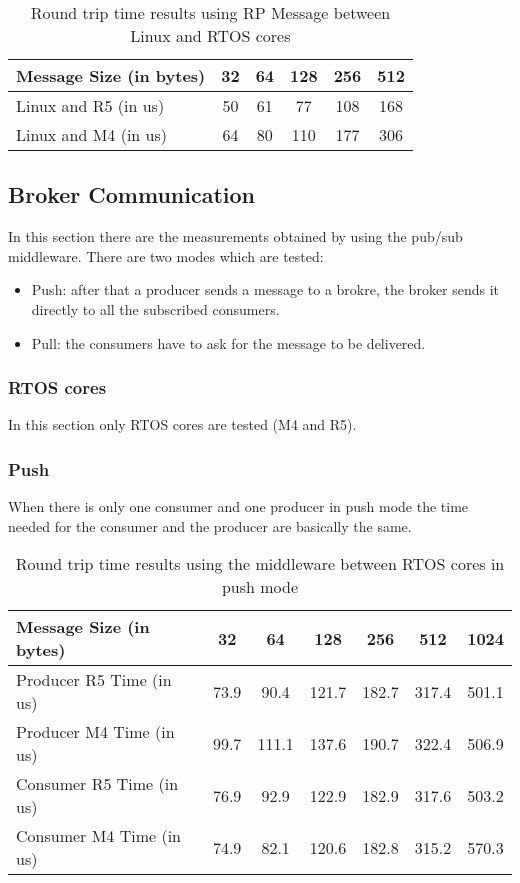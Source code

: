 \begin{table}
\centering
\caption{Round trip time results using RP Message between Linux and RTOS cores}
\label{table:direct_communication_linux_RTOS_cores}
\begin{tabular}{lccccc}
\toprule
Message Size (in bytes) & 32 & 64 & 128 & 256 & 512 \\
\midrule
Linux and R5 (in us) & 50 & 61 & 77 & 108 & 168 \\
Linux and M4 (in us) & 64 & 80 & 110 & 177 & 306 \\
\bottomrule
\end{tabular}
\end{table}

\subsection{Broker Communication}

In this section there are the measurements obtained by using the pub/sub
middleware. There are two modes which are tested:

\begin{itemize}
    \item   Push: after that a producer sends a message to a brokre, the broker
            sends it directly to all the subscribed consumers.
    \item   Pull: the consumers have to ask for the message to be delivered.
\end{itemize}

\subsubsection{RTOS cores}

In this section only RTOS cores are tested (M4 and R5).

\subsubsection{Push}

When there is only one consumer and one producer in push mode the time needed
for the consumer and the producer are basically the same.

\begin{table}
\centering
\caption{Round trip time results using the middleware between RTOS cores in
         push mode}
\label{table:broker_communication_RTOS_cores_push}
\begin{tabular}{lcccccc}
\toprule
Message Size (in bytes) & 32 & 64 & 128 & 256 & 512 & 1024 \\
\midrule
Producer R5 Time (in us) & 73.9 & 90.4 & 121.7 & 182.7 & 317.4 & 501.1 \\
Producer M4 Time (in us) & 99.7 & 111.1 & 137.6 & 190.7 & 322.4 & 506.9 \\
Consumer R5 Time (in us) & 76.9 & 92.9 & 122.9 & 182.9 & 317.6 & 503.2 \\
Consumer M4 Time (in us) & 74.9 & 82.1 & 120.6 & 182.8 & 315.2 & 570.3 \\
\bottomrule
\end{tabular}
\end{table}

